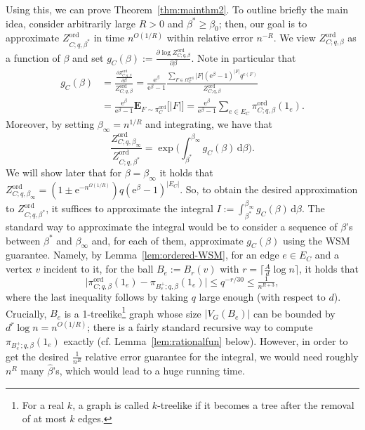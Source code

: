 \documentclass[11pt]{article}
\theoremstyle{plain}
\newcommand{\emm}{\mathrm{e}}
\newcommand{\Eb}{\mathbf{E}}
\newcommand{\1}{\mathbb{1}}
\newcommand{\ord}{\mathrm{ord}}
\begin{document}
Using this, we can prove Theorem~\ref{thm:mainthm2}. To outline briefly the main idea, consider arbitrarily large $R>0$ and $\beta^*\geq \beta_0$; then,  our goal is  to approximate $Z^{\ord}_{C;q,\beta^*}$ in time $n^{ O(1/R)}$ within relative error $n^{-R}$. We view $Z^{\ord}_{C;q,\beta}$ as a function of $\beta$ and set $g_C(\beta):=\frac{\partial 
 \log Z^{\ord}_{C;q,\beta}}{\partial \beta}$. Note in particular that
\begin{equation}\label{eq:gC}
\begin{aligned}
g_C(\beta)&=\frac{\frac{\partial 
Z^{\ord}_{C;q,\beta}}{\partial \beta}}{Z^{\ord}_{C;q,\beta}}=\frac{\emm^{\beta}}{\emm^{\beta}-1}\frac{\sum_{F\in \Omega^\ord_C} |F|(\emm^{\beta}-1)^{|F|}q^{c(F)}}{Z^{\ord}_{C;q,\beta}}
\\&=\frac{\emm^{\beta}}{\emm^{\beta}-1}\Eb_{F\sim \pi^{\ord}_C}\big[|F|\big]=\frac{\emm^{\beta}}{\emm^{\beta}-1}\sum_{e\in E_C} \pi^\ord_{C;q,\beta}(1_e).
\end{aligned}
\end{equation}
Moreover, by setting $\beta_\infty=n^{1/R}$ and integrating, we have that 
\begin{equation}\label{eq:interpolate123}\frac{Z^{\ord}_{C;q,\beta_\infty}}{Z^{\ord}_{C;q,\beta^*}}=\exp\bigg(\int^{\beta_\infty}_{\beta^*}g_C(\beta)\,\mathrm{d} \beta\bigg).
\end{equation}
We will show later that for $\beta=\beta_\infty$ it holds that $Z^{\ord}_{C;q,\beta_\infty}=(1\pm \emm^{-n^{\Omega(1/R)}}) q(\emm^\beta-1)^{|E_C|}$.
So, to obtain the desired approximation to $Z^{\ord}_{C;q,\beta^*}$, it suffices to approximate the integral $I:=\int^{\beta_\infty}_{\beta^*}g_C(\beta)\,\mathrm{d} \beta$. The standard way to approximate the integral would be to consider a sequence of $\beta$'s between $\beta^*$ and $\beta_\infty$ and, for each of them, approximate $g_C(\beta)$ using the WSM guarantee. Namely, by Lemma~\ref{lem:ordered-WSM}, for an edge $e\in E_C$ and a vertex $v$ incident to it, for the ball $B_e:=B_r(v)$ with $r=\lceil \tfrac{A}{d}\log n\rceil$, it holds that 
\begin{equation}\label{eq:WSMuse}
\big|\pi^\ord_{C;q,\beta}(1_e)-\pi_{B_e^+;q, \beta}(1_e)\big|\leq q^{-r/30}\leq \tfrac{1}{n^{R+3}},
\end{equation}
where the last inequality follows by taking $q$ large enough (with respect to $d$). Crucially,  $B_e$ is a 1-treelike\footnote{For a real $k$, a graph is called $k$-treelike if it becomes a tree after the removal of at most $k$ edges.} graph whose size $|V_G(B_e)|$ can be bounded by $d^r\log n=n^{O(1/R)}$; there  is a fairly standard recursive way to compute $\pi_{B_e^+;q,\beta}(1_e)$ exactly (cf. Lemma~\ref{lem:rationalfun} below).  However, in order to get the desired $ \tfrac{1}{n^R}$ relative error guarantee for the integral, we would need roughly $n^R$ many $\hat\beta$'s, which would lead to a huge running time.  
\end{document}
